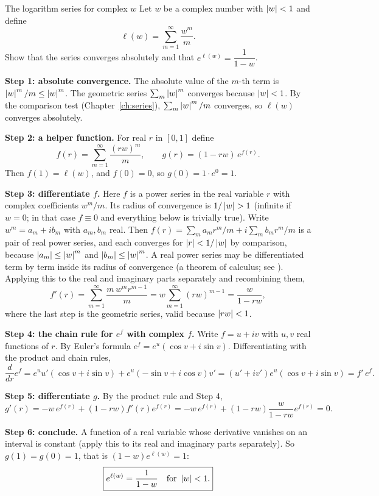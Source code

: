 \begin{sample}{The logarithm series for complex $w$}
Let $w$ be a complex number with $\left\lvert w\right\rvert<1$ and define
\[
\ell(w)=\sum_{m=1}^{\infty}\frac{w^{m}}{m}.
\]
Show that the series converges absolutely and that $e^{\ell(w)}=\dfrac{1}{1-w}$.

\textbf{Step 1: absolute convergence.} The absolute value of the $m$-th term is $\left\lvert w\right\rvert^m/m\le\left\lvert w\right\rvert^m$. The geometric series $\sum_m\left\lvert w\right\rvert^m$ converges because $\left\lvert w\right\rvert<1$. By the comparison test (Chapter~\ref{ch:series}), $\sum_m\left\lvert w\right\rvert^m/m$ converges, so $\ell(w)$ converges absolutely.

\textbf{Step 2: a helper function.} For real $r$ in $[0,1]$ define
\[
f(r)=\sum_{m=1}^{\infty}\frac{(rw)^{m}}{m},\qquad g(r)=(1-rw)\,e^{f(r)}.
\]
Then $f(1)=\ell(w)$, and $f(0)=0$, so $g(0)=1\cdot e^{0}=1$.

\textbf{Step 3: differentiate $f$.} Here $f$ is a power series in the real variable $r$ with complex coefficients $w^m/m$. Its radius of convergence is $1/\left\lvert w\right\rvert>1$ (infinite if $w=0$; in that case $f\equiv0$ and everything below is trivially true). Write $w^m=a_m+ib_m$ with $a_m,b_m$ real. Then $f(r)=\sum_m a_mr^m/m+i\sum_m b_mr^m/m$ is a pair of real power series, and each converges for $\left\lvert r\right\rvert<1/\left\lvert w\right\rvert$ by comparison, because $\left\lvert a_m\right\rvert\le\left\lvert w\right\rvert^m$ and $\left\lvert b_m\right\rvert\le\left\lvert w\right\rvert^m$. A real power series may be differentiated term by term inside its radius of convergence (a theorem of calculus; see \cite{rhb}). Applying this to the real and imaginary parts separately and recombining them,
\[
f'(r)=\sum_{m=1}^{\infty}\frac{m\,w^{m}r^{m-1}}{m}=w\sum_{m=1}^{\infty}(rw)^{m-1}=\frac{w}{1-rw},
\]
where the last step is the geometric series, valid because $\left\lvert rw\right\rvert<1$.

\textbf{Step 4: the chain rule for $e^{f}$ with complex $f$.} Write $f=u+iv$ with $u,v$ real functions of $r$. By Euler's formula $e^{f}=e^{u}(\cos v+i\sin v)$. Differentiating with the product and chain rules,
\[
\frac{d}{dr}e^{f}=e^{u}u'(\cos v+i\sin v)+e^{u}(-\sin v+i\cos v)v'=(u'+iv')e^{u}(\cos v+i\sin v)=f'\,e^{f}.
\]

\textbf{Step 5: differentiate $g$.} By the product rule and Step 4,
\[
g'(r)=-w\,e^{f(r)}+(1-rw)f'(r)e^{f(r)}=-w\,e^{f(r)}+(1-rw)\frac{w}{1-rw}e^{f(r)}=0.
\]

\textbf{Step 6: conclude.} A function of a real variable whose derivative vanishes on an interval is constant (apply this to its real and imaginary parts separately). So $g(1)=g(0)=1$, that is $(1-w)e^{\ell(w)}=1$:
\[
\boxed{e^{\ell(w)}=\frac{1}{1-w}\quad\text{for }\left\lvert w\right\rvert<1.}
\]
\end{sample}

